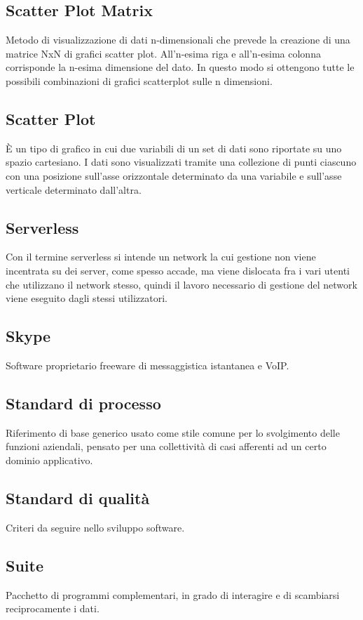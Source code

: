 \documentclass[../glossario.tex]{subfiles}
\begin{document}
\subsection*{Scatter Plot Matrix}
{}
Metodo di visualizzazione di dati n-dimensionali che prevede la creazione di una matrice NxN di grafici scatter plot. All’n-esima riga e all’n-esima colonna corrisponde la n-esima dimensione del dato. In questo modo si ottengono tutte le possibili combinazioni di grafici scatterplot sulle n dimensioni.

\subsection*{Scatter Plot}
{}
È un tipo di grafico in cui due variabili di un set di dati sono riportate su uno spazio cartesiano. I dati sono visualizzati tramite una collezione di punti ciascuno con una posizione sull'asse orizzontale determinato da una variabile e sull'asse verticale determinato dall'altra.


\subsection*{Serverless}
{}
Con il termine serverless si intende un network la cui gestione non viene incentrata su dei server, come spesso accade, ma viene dislocata fra i vari utenti che utilizzano il network stesso, quindi il lavoro necessario di gestione del network viene eseguito dagli stessi utilizzatori.

\subsection*{Skype}
{}
Software proprietario freeware di messaggistica istantanea e VoIP.

\subsection*{Standard di processo}
{}
Riferimento di base generico usato come stile comune per lo svolgimento delle funzioni aziendali, pensato per una collettività di casi afferenti ad un certo dominio applicativo.

\subsection*{Standard di qualità}
{}
Criteri da seguire nello sviluppo software.


\subsection*{Suite}
{}
Pacchetto di programmi complementari, in grado di interagire e di scambiarsi reciprocamente i dati.
\end{document}

